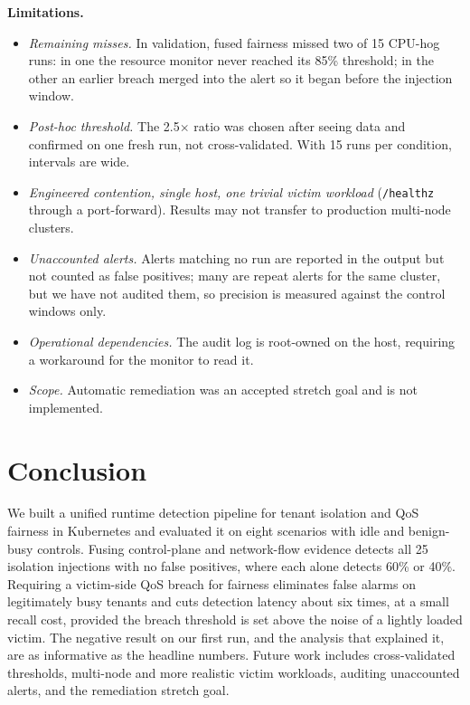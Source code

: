 \documentclass[conference]{IEEEtran}
\newcommand{\code}[1]{\texttt{\small #1}}
\begin{document}
\textbf{Limitations.}
\begin{itemize}
\item \emph{Remaining misses.} In validation, fused fairness missed two of 15 CPU-hog runs: in one the resource monitor never reached its 85\% threshold; in the other an earlier breach merged into the alert so it began before the injection window.
\item \emph{Post-hoc threshold.} The 2.5$\times$ ratio was chosen after seeing data and confirmed on one fresh run, not cross-validated. With 15 runs per condition, intervals are wide.
\item \emph{Engineered contention, single host, one trivial victim workload} (\code{/healthz} through a port-forward). Results may not transfer to production multi-node clusters.
\item \emph{Unaccounted alerts.} Alerts matching no run are reported in the output but not counted as false positives; many are repeat alerts for the same cluster, but we have not audited them, so precision is measured against the control windows only.
\item \emph{Operational dependencies.} The audit log is root-owned on the host, requiring a workaround for the monitor to read it.
\item \emph{Scope.} Automatic remediation was an accepted stretch goal and is not implemented.
\end{itemize}

\section{Conclusion}
We built a unified runtime detection pipeline for tenant isolation and QoS fairness in Kubernetes and evaluated it on eight scenarios with idle and benign-busy controls. Fusing control-plane and network-flow evidence detects all 25 isolation injections with no false positives, where each alone detects 60\% or 40\%. Requiring a victim-side QoS breach for fairness eliminates false alarms on legitimately busy tenants and cuts detection latency about six times, at a small recall cost, provided the breach threshold is set above the noise of a lightly loaded victim. The negative result on our first run, and the analysis that explained it, are as informative as the headline numbers. Future work includes cross-validated thresholds, multi-node and more realistic victim workloads, auditing unaccounted alerts, and the remediation stretch goal.
\end{document}
